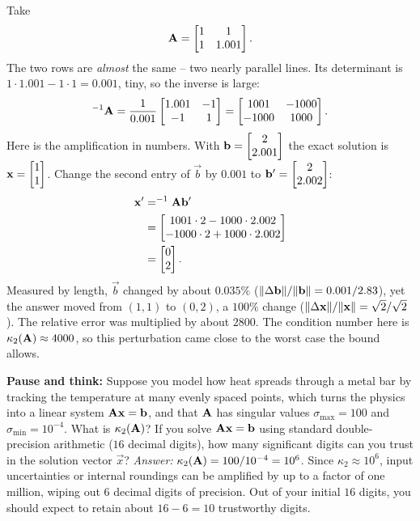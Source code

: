 \begin{example}
\label{ch33:cond2x2}
Take
\[
  \mathbf{A} = \begin{bmatrix} 1 & 1 \\ 1 & 1.001 \end{bmatrix}.
\]
The two rows are \emph{almost} the same -- two nearly parallel lines. Its determinant
is $1\cdot 1.001 - 1\cdot 1 = 0.001$, tiny, so the inverse is large:
\[
  ^{-1}{\mathbf{A}} = \frac{1}{0.001}\begin{bmatrix} 1.001 & -1 \\ -1 & 1 \end{bmatrix}
   = \begin{bmatrix} 1001 & -1000 \\ -1000 & 1000 \end{bmatrix}.
\]
Here is the amplification in numbers. With $\mathbf{b}=\begin{bmatrix}2\\2.001\end{bmatrix}$ the exact
solution is $\mathbf{x}=\begin{bmatrix}1\\1\end{bmatrix}$. Change the second entry of $\vec{b}$ by
$0.001$ to $\mathbf{b}'=\begin{bmatrix}2\\2.002\end{bmatrix}$:
\begin{align*}
  \mathbf{x}' &= ^{-1}{\mathbf{A}}\mathbf{b}' \\
           &= \begin{bmatrix}1001\cdot 2 - 1000\cdot 2.002 \\ -1000\cdot 2 + 1000\cdot 2.002\end{bmatrix} \\
           &= \begin{bmatrix}0\\2\end{bmatrix}.
\end{align*}
Measured by length, $\vec{b}$ changed by about $0.035\%$
($\lVert\Delta\mathbf{b}\rVert/\lVert\mathbf{b}\rVert = 0.001/2.83$), yet the answer moved from $(1,1)$ to
$(0,2)$, a $100\%$ change ($\lVert\Delta\mathbf{x}\rVert/\lVert\mathbf{x}\rVert = \sqrt2/\sqrt2$). The
relative error was multiplied by about $2800$. The condition number here is
$\kappa_2(\mathbf{A})\approx 4000$, so this perturbation came close to the worst case the
bound allows.
\end{example}

\begin{recoverybox}
\textbf{Pause and think:} Suppose you model how heat spreads through a metal bar by
tracking the temperature at many evenly spaced points, which turns the physics into a
linear system $\mathbf{A}\mathbf{x}=\mathbf{b}$, and that $\mathbf{A}$ has singular values $\sigma_{\max} = 100$ and
$\sigma_{\min} = 10^{-4}$. What is $\kappa_2(\mathbf{A})$? If you solve $\mathbf{A}\mathbf{x}=\mathbf{b}$
using standard double-precision arithmetic ($16$ decimal digits), how many significant
digits can you trust in the solution vector $\vec{x}$?
\emph{Answer:} $\kappa_2(\mathbf{A}) = 100 / 10^{-4} = 10^6$. Since $\kappa_2 \approx 10^6$,
input uncertainties or internal roundings can be amplified by up to a factor of one
million, wiping out $6$ decimal digits of precision. Out of your initial $16$ digits,
you should expect to retain about $16 - 6 = 10$ trustworthy digits.
\end{recoverybox}

